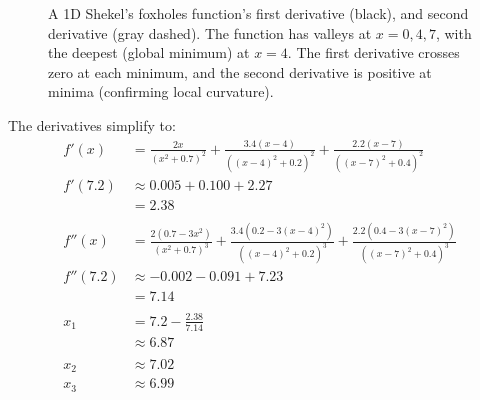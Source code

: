 \begin{figure}[h]
    \centering
    \caption{A 1D Shekel's foxholes function's first derivative (black), and second derivative (gray dashed). The function has valleys at $x = 0, 4, 7$, with the deepest (global minimum) at $x = 4$. The first derivative crosses zero at each minimum, and the second derivative is positive at minima (confirming local curvature).}
    \label{fig:shekel_foxholes_derivatives}
\end{figure}

The derivatives simplify to:
\begin{align*}
    f'(x) &= \frac{2x}{(x^2 + 0.7)^2} + \frac{3.4(x-4)}{((x-4)^2 + 0.2)^2} + \frac{2.2(x-7)}{((x-7)^2 + 0.4)^2} \\[0.5em]
    f'(7.2) &\approx 0.005 + 0.100 + 2.27 \\
    &= 2.38 \\
    \\
    f''(x) &= \frac{2(0.7 - 3x^2)}{(x^2 + 0.7)^3} + \frac{3.4(0.2 - 3(x-4)^2)}{((x-4)^2 + 0.2)^3} + \frac{2.2(0.4 - 3(x-7)^2)}{((x-7)^2 + 0.4)^3}\\[0.5em]
    f''(7.2) &\approx -0.002 - 0.091 + 7.23 \\
    &= 7.14 \\
    \\  
    x_1 &= 7.2 - \frac{2.38}{7.14} \\
    &\approx 6.87 \\
    \\
    x_2 &\approx 7.02 \\
    x_3 &\approx 6.99
\end{align*}

